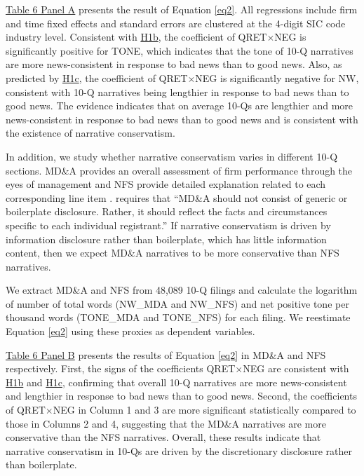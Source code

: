 \documentclass[letterpaper,12pt]{article}
\begin{document}
\begin{spacing}{1.5}
\hyperref[T6PA]{Table 6 Panel A} presents the result of Equation \eqref{eq2}. All regressions include firm and time fixed effects and standard errors are clustered at the 4-digit SIC code industry level. Consistent with \hyperref[hyp:h1b]{H1b}, the coefficient of QRET$\times$NEG is significantly positive for TONE, which indicates that the tone of 10-Q narratives are more news-consistent in response to bad news than to good news. Also, as predicted by \hyperref[hyp:h1c]{H1c}, the coefficient of QRET$\times$NEG is significantly negative for NW, consistent with 10-Q narratives being lengthier in response to bad news than to good news. The evidence indicates that on average 10-Qs are lengthier and more news-consistent in response to bad news than to good news and is consistent with the existence of narrative conservatism.

In addition, we study whether narrative conservatism varies in different 10-Q sections. MD\&A provides an overall assessment of firm performance through the eyes of management and NFS provide detailed explanation related to each corresponding line item \cite{fasbConceptualFrameworkFinancial2018a, secFinancialReportingManual2019}.  requires that ``MD\&A should not consist of generic or boilerplate disclosure. Rather, it should reflect the facts and circumstances specific to each individual registrant.'' If narrative conservatism is driven by information disclosure rather than boilerplate, which has little information content, then we expect MD\&A narratives to be more conservative than NFS narratives.

We extract MD\&A and NFS from 48,089 10-Q filings and calculate the logarithm of number of total words (NW\_MDA and NW\_NFS) and net positive tone per thousand words (TONE\_MDA and TONE\_NFS) for each filing. We reestimate Equation \eqref{eq2} using these proxies as dependent variables.

\hyperref[T6PB]{Table 6 Panel B} presents the results of Equation \eqref{eq2} in MD\&A and NFS respectively. First, the signs of the coefficients QRET$\times$NEG are consistent with \hyperref[hyp:h1b]{H1b} and \hyperref[hyp:h1c]{H1c}, confirming that overall 10-Q narratives are more news-consistent and lengthier in response to bad news than to good news. Second, the coefficients of QRET$\times$NEG in Column 1 and 3 are more significant statistically compared to those in Columns 2 and 4, suggesting that the MD\&A narratives are more conservative than the NFS narratives. Overall, these results indicate that narrative conservatism in 10-Qs are driven by the discretionary disclosure rather than boilerplate.


\end{spacing}
\end{document}
